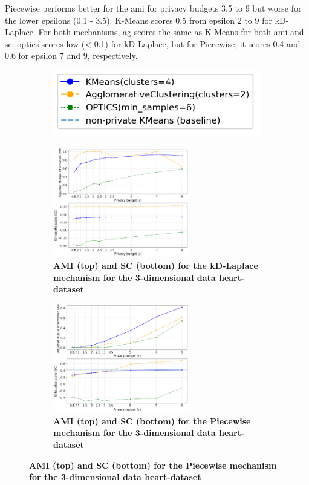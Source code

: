 Piecewise performs better for the \gls{ami} for privacy budgets 3.5 to 9 but worse for the lower epsilons (0.1 - 3.5).
K-Means scores 0.5 from epsilon 2 to 9 for kD-Laplace.
For both mechanisms, \gls{ag} scores the same as K-Means for both \gls{ami} and \gls{sc}.
\gls{optics} scores low (< 0.1) for kD-Laplace, but for Piecewise, it scores 0.4 and 0.6 for epsilon 7 and 9, respectively.
\newpage
\begin{figure}[H]
      \centering
      \begin{subfigure}{0.3\textwidth}
            \includegraphics[width=\textwidth]{Results/kd-laplace/kd-Laplace/heart-dataset/legend_3.png}
      \end{subfigure}
      \begin{subfigure}{1\textwidth}
            \caption{\textbf{AMI (top) and SC (bottom) for the kD-Laplace mechanism for the 3-dimensional data heart-dataset}}
            \centering
            \includegraphics[width=0.65\textwidth]{Results/kd-laplace/kd-Laplace/heart-dataset/ami-and-sc_3_dimensions.png}
            \centering
      \end{subfigure}
      \begin{subfigure}{1\textwidth}
            \caption{\textbf{AMI (top) and SC (bottom) for the Piecewise mechanism for the 3-dimensional data heart-dataset}}
            \centering
            \includegraphics[width=0.65\textwidth]{Results/kd-laplace/piecewise/heart-dataset/ami-and-sc_3_dimensions.png}

\end{subfigure}
\end{figure}
